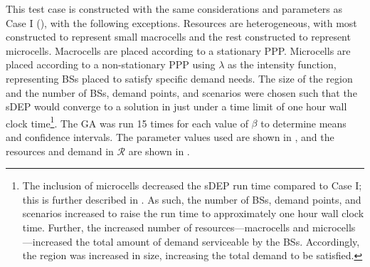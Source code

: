 \documentclass[12pt,dvipsnames]{report}
\begin{document}
This test case is constructed with the same considerations and parameters as Case I (), with the following exceptions.  Resources are heterogeneous, with most constructed to represent small macrocells and the rest constructed to represent microcells.  Macrocells are placed according to a stationary PPP.  Microcells are placed according to a non-stationary PPP using $\lambda$ as the intensity function, representing BSs placed to satisfy specific demand needs.  The size of the region and the number of BSs, demand points, and scenarios were chosen such that the sDEP would converge to a solution in just under a time limit of one hour wall clock time\footnote{\label{foot:caseII_setup}The inclusion of microcells decreased the sDEP run time compared to Case I; this is further described in .  As such, the number of BSs, demand points, and scenarios increased to raise the run time to approximately one hour wall clock time.  Further, the increased number of resources---macrocells and microcells---increased the total amount of demand serviceable by the BSs.  Accordingly, the region was increased in size, increasing the total demand to be satisfied.}.  The GA was run 15 times for each value of $\beta$ to determine means and confidence intervals.  The parameter values used are shown in , and the resources and demand in $\mathcal{R}$ are shown in .
\end{document}
